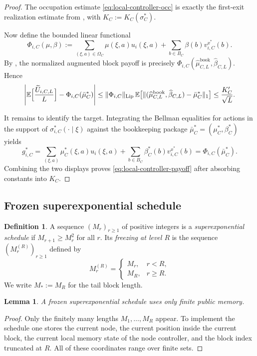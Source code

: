 \documentclass[12pt]{article}
\newtheorem{lemma}[theorem]{Lemma}
\theoremstyle{definition}
\newtheorem{definition}[theorem]{Definition}
\newcommand{\E}{\mathbb{E}}
\newcommand{\1}{\mathbf{1}}
\begin{document}
\begin{proof}
The occupation estimate \eqref{eq:local-controller-occ} is exactly the first-exit
realization estimate from , with
$K_C:=K_C(\sigma_C^*)$.

Now define the bounded linear functional
\[
\Phi_{i,C}(\mu,\beta)
:=
\sum_{(\xi,a)\in\Omega_C}\mu(\xi,a)u_i(\xi,a)
+
\sum_{b\in B_C}\beta(b)v_{i,C}^{x^*}(b).
\]
By , the normalized augmented block payoff is precisely
$\Phi_{i,C}(\widehat\mu_{C,L}^{\mathrm{book}},\widehat\beta_{C,L})$. Hence
\[
\left|
\E\Bigl[\frac{\widetilde U_{i,C,L}}{L}\Bigr]-\Phi_{i,C}(\bar\mu_C^*)
\right|
\le
\|\Phi_{i,C}\|_{\mathrm{Lip}}\,
\E\bigl[\|(\widehat\mu_{C,L}^{\mathrm{book}},\widehat\beta_{C,L})-\bar\mu_C^*\|_1\bigr]
\le \frac{K_C'}{\sqrt L}.
\]

It remains to identify the target. Integrating the Bellman equalities for actions
in the support of $\sigma_{i,C}^*(\cdot\mid\xi)$ against the bookkeeping package
$\bar\mu_C^*=(\mu_C^*,\beta_C^*)$ yields
\[
g_{i,C}^*
=
\sum_{(\xi,a)}\mu_C^*(\xi,a)u_i(\xi,a)
+
\sum_{b\in B_C}\beta_C^*(b)v_{i,C}^{x^*}(b)
=
\Phi_{i,C}(\bar\mu_C^*).
\]
Combining the two displays proves \eqref{eq:local-controller-payoff} after
absorbing constants into $K_C$.
\end{proof}

\subsection{Frozen superexponential schedule}

\begin{definition}
A sequence $(M_r)_{r\ge 1}$ of positive integers is a
\emph{superexponential schedule} if $M_{r+1}\ge M_r^2$ for all $r$. Its
\emph{freezing at level $R$} is the sequence $(M_r^{(R)})_{r\ge 1}$ defined by
\[
M_r^{(R)}=
\begin{cases}
M_r, & r<R,\\
M_R, & r\ge R.
\end{cases}
\]
We write $M_*:=M_R$ for the tail block length.
\end{definition}

\begin{lemma}
\label{lem:frozen-memory}
A frozen superexponential schedule uses only finite public memory.
\end{lemma}

\begin{proof}
Only the finitely many lengths $M_1,\dots,M_R$ appear. To implement the schedule
one stores the current node, the current position inside the current block, the
current local memory state of the node controller, and the block index truncated at
$R$. All of these coordinates range over finite sets.
\end{proof}
\end{document}
